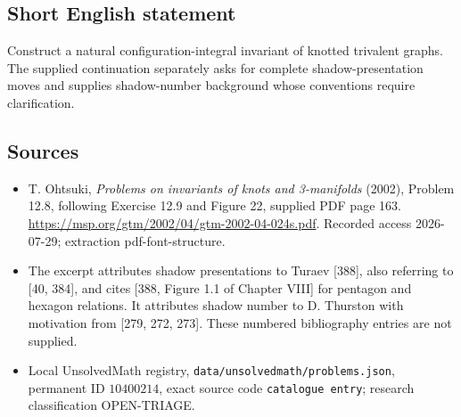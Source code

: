 \documentclass[11pt]{article}
\begin{document}
\subsection{Short English statement}
Construct a natural configuration-integral invariant of knotted trivalent graphs. The supplied continuation separately asks for complete shadow-presentation moves and supplies shadow-number background whose conventions require clarification.
\subsection{Sources}
\begin{itemize}
\item T. Ohtsuki, \emph{Problems on invariants of knots and 3-manifolds} (2002), Problem 12.8, following Exercise 12.9 and Figure 22, supplied PDF page 163. \url{https://msp.org/gtm/2002/04/gtm-2002-04-024s.pdf}. Recorded access 2026-07-29; extraction pdf-font-structure.
\item The excerpt attributes shadow presentations to Turaev [388], also referring to [40, 384], and cites [388, Figure 1.1 of Chapter VIII] for pentagon and hexagon relations. It attributes shadow number to D. Thurston with motivation from [279, 272, 273]. These numbered bibliography entries are not supplied.
\item Local UnsolvedMath registry, \texttt{data/unsolvedmath/problems.json}, permanent ID \(10400214\), exact source code \texttt{catalogue entry}; research classification OPEN-TRIAGE.
\end{itemize}
\end{document}
